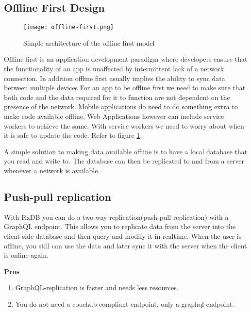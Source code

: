 \subsection{Offline First Design}

\begin{figure}[h!]
    \begin{center}
        \texttt{[image: offline-first.png]}
    \end{center}
    \caption{Simple architecture of the offline first model}
    \label{fig:offline-first}
\end{figure}

Offline first is an application development paradigm where developers ensure that the 
functionality of an app is unaffected by intermittent lack of a network connection. 
In addition offline first usually implies the ability to sync data between multiple devices
For an app to be offline first we need to make sure that both code and the data required 
for it to function are not dependent on the presence of the network.
Mobile applications do need to do something extra to make code available offline,
Web Applications however can include service workers to achieve the same.
With service workers we need to worry about when it is safe to update the code. 
Refer to figure \ref{fig:offline-first}.

A simple solution to making data available offline is to have a local database 
that you read and write to. The database can then be replicated to and from a 
server whenever a network is available.~\cite{HasuraOfflineFirst}


\subsection{Push-pull replication}

With RxDB you can do a two-way replication(push-pull replication) with a GraphQL endpoint. 
This allows you to replicate data from the server into the client-side database and then 
query and modify it in realtime.
When the user is offline, you still can use the data and later sync it with the server 
when the client is online again.

\textbf{Pros}
\begin{enumerate}
    \item GraphQL-replication is faster and needs less resources.
    \item You do not need a couchdb-compliant endpoint, only a graphql-endpoint.
\end{enumerate}

